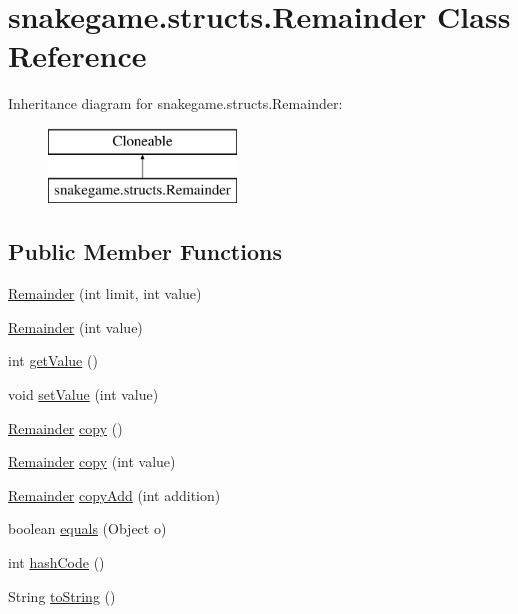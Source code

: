 \hypertarget{classsnakegame_1_1structs_1_1_remainder}{}\section{snakegame.\+structs.\+Remainder Class Reference}
\label{classsnakegame_1_1structs_1_1_remainder}
Inheritance diagram for snakegame.\+structs.\+Remainder\+:\begin{figure}[H]
\begin{center}
\leavevmode
\includegraphics[height=2.000000cm]{classsnakegame_1_1structs_1_1_remainder}
\end{center}
\end{figure}
\subsection*{Public Member Functions}
\begin{DoxyCompactItemize}
\item 
\mbox{\hyperlink{classsnakegame_1_1structs_1_1_remainder_a5895859e2b9b2562a12a72495e316e9c}{Remainder}} (int limit, int value)
\item 
\mbox{\hyperlink{classsnakegame_1_1structs_1_1_remainder_ad01229fb264baa7f39848cb0c6db8afa}{Remainder}} (int value)
\item 
int \mbox{\hyperlink{classsnakegame_1_1structs_1_1_remainder_ad44771e1b21d1bd2ecb4b1f676395001}{get\+Value}} ()
\item 
void \mbox{\hyperlink{classsnakegame_1_1structs_1_1_remainder_ac280dde02bcc57ea35c8c7617cb57767}{set\+Value}} (int value)
\item 
\mbox{\hyperlink{classsnakegame_1_1structs_1_1_remainder}{Remainder}} \mbox{\hyperlink{classsnakegame_1_1structs_1_1_remainder_a3493d7ad668664ccd4089127794c4818}{copy}} ()
\item 
\mbox{\hyperlink{classsnakegame_1_1structs_1_1_remainder}{Remainder}} \mbox{\hyperlink{classsnakegame_1_1structs_1_1_remainder_a63bde400c1715836940db745a1e15f7f}{copy}} (int value)
\item 
\mbox{\hyperlink{classsnakegame_1_1structs_1_1_remainder}{Remainder}} \mbox{\hyperlink{classsnakegame_1_1structs_1_1_remainder_a0f899c321de31015e66951a3ea2cbcc3}{copy\+Add}} (int addition)
\item 
boolean \mbox{\hyperlink{classsnakegame_1_1structs_1_1_remainder_a5d11bc092dc689a2ddcff2947c27c679}{equals}} (Object o)
\item 
int \mbox{\hyperlink{classsnakegame_1_1structs_1_1_remainder_a65f6ae72c496323b19f05bbc93269127}{hash\+Code}} ()
\item 
String \mbox{\hyperlink{classsnakegame_1_1structs_1_1_remainder_a6d69e20d1a02d3feac7ce7873ed4d172}{to\+String}} ()
\end{DoxyCompactItemize}


